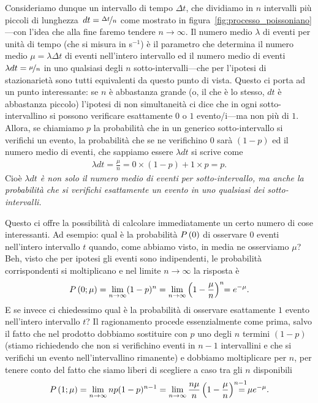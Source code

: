 Consideriamo dunque un intervallo di tempo $\Delta t$, che dividiamo in $n$
intervalli più piccoli di lunghezza~$dt = \nicefrac{\Delta t}{n}$ come
mostrato in figura~\ref{fig:processo_poissoniano}---con l'idea che alla fine
faremo tendere $n \rightarrow \infty$. Il numero medio $\lambda$ di
eventi per unità di tempo (che si misura in s$^{-1}$) è il parametro che
determina il numero medio $\mu = \lambda \Delta t$ di eventi nell'intero
intervallo ed il numero medio di eventi $\lambda dt = \nicefrac{\mu}{n}$ in
uno qualsiasi degli $n$ sotto-intervalli---che per l'ipotesi di stazionarietà
sono tutti equivalenti da questo punto di vista. Questo ci porta ad un punto
interessante: se $n$ è abbastanza grande (o, il che è lo stesso, $dt$ è
abbastanza piccolo) l'ipotesi di non simultaneità ci dice che in ogni
sotto-intervallino si possono verificare esattamente $0$ o $1$ evento/i---ma non
più di $1$. Allora, se chiamiamo $p$ la probabilità che in un generico
sotto-intervallo si verifichi un evento, la probabilità che se ne verifichino
$0$ sarà $(1 - p)$ ed il numero medio di eventi, che sappiamo essere
$\lambda dt$ si scrive come
\begin{align*}
  \lambda dt = \frac{\mu}{n} = 0 \times (1 - p) + 1 \times p = p.
\end{align*}
Cioè \emph{$\lambda dt$ è non solo il numero medio di eventi per
  sotto-intervallo, ma anche la probabilità che si verifichi esattamente un
  evento in uno qualsiasi dei sotto-intervalli.}

Questo ci offre la possibilità di calcolare immediatamente un certo numero
di cose interessanti. Ad esempio: qual è la probabilità $\displaystyle P\left(0\right)$ di
osservare $0$ eventi nell'intero intervallo $t$ quando, come abbiamo visto,
in media ne osserviamo $\mu$? Beh, visto che per ipotesi gli eventi sono
indipendenti, le probabilità corrispondenti si moltiplicano e nel limite
$n \rightarrow \infty$ la risposta è
\begin{align*}
  \displaystyle P\left(0; \mu\right) =
  \lim_{n \rightarrow \infty} (1 - p)^{n} =
  \lim_{n \rightarrow \infty} \left(1 - \frac{\mu}{n} \right)^{n} \!\! = e^{-\mu}.
\end{align*}
E se invece ci chiedessimo qual è la probabilità di osservare esattamente
$1$ evento nell'intero intervallo $t$? Il ragionamento procede essenzialmente
come prima, salvo il fatto che nel prodotto dobbiamo sostituire con $p$ uno
degli $n$ termini $(1 - p)$ (stiamo richiedendo che non si verifichino eventi
in $n - 1$ intervallini e che si verifichi un evento nell'intervallino
rimanente) e dobbiamo moltiplicare per $n$, per tenere conto del fatto che
siamo liberi di scegliere a caso tra gli $n$ disponibili
\begin{align*}
  \prob{1; \mu} = \lim_{n \rightarrow \infty} np(1 - p)^{n - 1} =
  \lim_{n \rightarrow \infty}
  \frac{n\mu}{n} \left(1 - \frac{\mu}{n} \right)^{n - 1} \!\!\!\!\!\!\!\! =
  \mu e^{-\mu}.
\end{align*}

